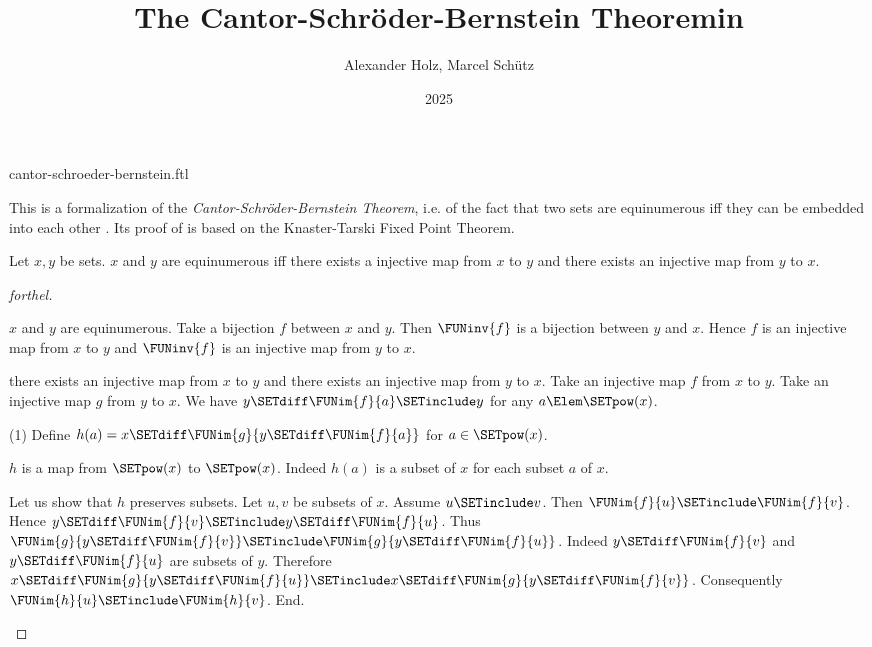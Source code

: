 \documentclass{stex}
\title{The Cantor-Schröder-Bernstein Theoremin \Naproche}
\author{Alexander Holz, Marcel Schütz}
\date{2025}
\begin{document}
\begin{smodule}{cantor-schroeder-bernstein.ftl}
\maketitle



\noindent This is a formalization of the \textit{Cantor-Schröder-Bernstein
Theorem}, i.e. of the fact that two sets are equinumerous iff they can be
embedded into each other \cite{Schroeder2012}.
Its proof of is based on the Knaster-Tarski Fixed Point Theorem.

\begin{theorem}[forthel,title=Cantor-Schröder-Bernstein,name=Cantor-Schroeder-Bernstein]
  Let $x,y$ be sets.
  $x$ and $y$ are equinumerous iff there exists a injective map from $x$ to $y$ and there exists an injective map from $y$ to $x$.
\end{theorem}
\begin{proof}[forthel]
  \begin{case}{$x$ and $y$ are equinumerous.}
    Take a bijection $f$ between $x$ and $y$.
    Then $\FUNinv{f}$ is a bijection between $y$ and $x$.
    Hence $f$ is an injective map from $x$ to $y$ and $\FUNinv{f}$ is an
    injective map from $y$ to $x$.
  \end{case}

  \begin{case}{there exists an injective map from $x$ to $y$ and there exists an injective map from $y$ to $x$.}
    Take an injective map $f$ from $x$ to $y$.
    Take an injective map $g$ from $y$ to $x$.
    We have $y \SETdiff \FUNim{f}{a} \SETinclude y$ for any $a \Elem \SETpow(x)$.

    (1) Define $h(a) = x \SETdiff \FUNim{g}{y \SETdiff \FUNim{f}{a}}$ for $a \in \SETpow(x)$.

    $h$ is a map from $\SETpow(x)$ to $\SETpow(x)$.
    Indeed $h(a)$ is a subset of $x$ for each subset $a$ of $x$.

    Let us show that $h$ preserves subsets.
      Let $u, v$ be subsets of $x$.
      Assume $u \SETinclude v$.
      Then $\FUNim{f}{u} \SETinclude \FUNim{f}{v}$.
      Hence $y \SETdiff \FUNim{f}{v} \SETinclude y \SETdiff \FUNim{f}{u}$.
      Thus $\FUNim{g}{y \SETdiff \FUNim{f}{v}} \SETinclude\linebreak \FUNim{g}{y \SETdiff \FUNim{f}{u}}$.
      Indeed $y \SETdiff \FUNim{f}{v}$ and $y \SETdiff \FUNim{f}{u}$ are subsets of $y$.
      Therefore\linebreak $x \SETdiff \FUNim{g}{y \SETdiff \FUNim{f}{u}} \SETinclude x \SETdiff \FUNim{g}{y \SETdiff \FUNim{f}{v}}$.
      Consequently $\FUNim{h}{u} \SETinclude \FUNim{h}{v}$.
    End.


\end{case}
\end{proof}
\end{smodule}
\end{document}
